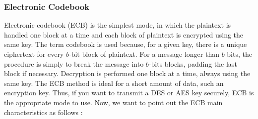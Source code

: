 \documentclass[11pt]{article}
\begin{document}
\subsubsection{Electronic Codebook}
Electronic codebook (ECB) is the simplest mode, in which the plaintext is handled one block at a time and each block of plaintext is encrypted using the same key. The term codebook is used because, for a given key, there is a unique ciphertext for every $b$-bit block of plaintext. For a message longer than $b$ bits, the procedure is simply to break the message into $b$-bits blocks, padding the last block if necessary. Decryption is performed one block at a time, always using the same key. The ECB method is ideal for a short amount of data, such an encryption key. Thus, if you want to transmit a DES or AES key securely, ECB is the appropriate mode to use. Now, we want to point out the ECB main characteristics as follows :
\end{document}
